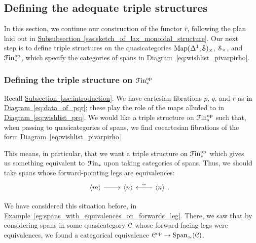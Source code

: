 \documentclass[main.tex]{subfiles}
\begin{document}
\subsection{Defining the adequate triple structures}
\label{ssc:restricting_the_legs_of_the_spans}

In this section, we continue our construction of the functor $\hat{r}$, following the plan laid out in \hyperref[sss:sketch_of_lax_monoidal_structure]{Subsubsection~\ref*{sss:sketch_of_lax_monoidal_structure}}. Our next step is to define triple structures on the quasicategories $\Map(\Delta^{1}, \S)_{\times}$, $\S_{\times}$, and $\Finp\op$, which specify the categories of spans in \hyperref[eq:wishlist_pivarpirho]{Diagram~\ref*{eq:wishlist_pivarpirho}}.

\subsubsection{Defining the triple structure on \texorpdfstring{$\Finp\op$}{Fin.op}}

Recall \hyperref[ssc:introduction]{Subsection~\ref*{ssc:introduction}}. We have cartesian fibrations $p$, $q$, and $r$ as in \hyperref[eq:data_of_pqr]{Diagram~\ref*{eq:data_of_pqr}}; these play the role of the maps alluded to in \hyperref[eq:wishlist_prq]{Diagram~\ref*{eq:wishlist_prq}}. We would like a triple structure on $\Finp\op$ such that, when passing to quasicategories of spans, we find cocartesian fibrations of the form \hyperref[eq:wishlist_pivarpirho]{Diagram~\ref*{eq:wishlist_pivarpirho}}.

This means, in particular, that we want a triple structure on $\Finp\op$ which gives us something equivalent to $\Finp$ upon taking categories of spans. Thus, we should take spans whose forward-pointing legs are equivalences:
\begin{equation*}
  \begin{tikzcd}
    \langle m \rangle
    \arrow[r]
    & \langle n \rangle
    & \langle n \rangle
    \arrow[l, swap, "\simeq"]
  \end{tikzcd}.
\end{equation*}

We have considered this situation before, in \hyperref[eg:spans_with_equivalences_on_forwards_leg]{Example~\ref*{eg:spans_with_equivalences_on_forwards_leg}}. There, we saw that by considering spans in some quasicategory $\category{C}$ whose forward-facing legs were equivalences, we found a categorical equivalence $\category{C}\op \to \Span_{\simeq}(\category{C})$.
\end{document}
